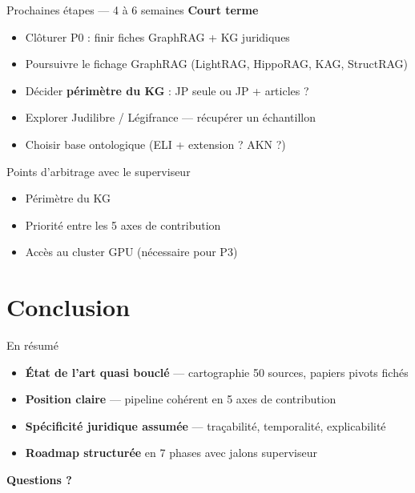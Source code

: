 \documentclass[aspectratio=169,10pt]{beamer}
\begin{document}
\begin{frame}{Prochaines étapes --- 4 à 6 semaines}
  \textbf{Court terme}
  \begin{itemize}
    \item Clôturer P0 : finir fiches GraphRAG + KG juridiques
    \item Poursuivre le fichage GraphRAG (LightRAG, HippoRAG, KAG, StructRAG)
    \item Décider \textbf{périmètre du KG} : JP seule ou JP + articles ?
    \item Explorer Judilibre / Légifrance --- récupérer un échantillon
    \item Choisir base ontologique (ELI + extension ? AKN ?)
  \end{itemize}

  \begin{alertblock}{Points d'arbitrage avec le superviseur}
    \begin{itemize}
      \item Périmètre du KG
      \item Priorité entre les 5 axes de contribution
      \item Accès au cluster GPU (nécessaire pour P3)
    \end{itemize}
  \end{alertblock}
\end{frame}

\section*{Conclusion}

\begin{frame}{En résumé}
  \begin{itemize}
    \item \textbf{État de l'art quasi bouclé} --- cartographie 50 sources, papiers pivots fichés
    \item \textbf{Position claire} --- pipeline cohérent en 5 axes de contribution
    \item \textbf{Spécificité juridique assumée} --- traçabilité, temporalité, explicabilité
    \item \textbf{Roadmap structurée} en 7 phases avec jalons superviseur
  \end{itemize}

  \vfill
  \centering
  \Large\textbf{Questions ?}
\end{frame}
\end{document}
